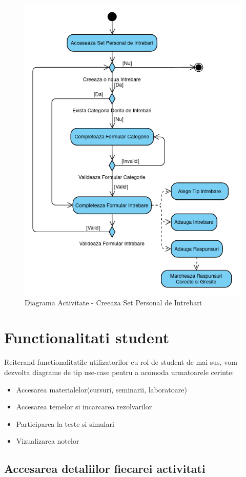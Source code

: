 \documentclass[12pt, a4paper, oneside, romanian]{teza-upb}
\begin{document}
\begin{figure}[H]
\centering
\includegraphics*[width=0.75\columnwidth]{diagrama-activitate-creeaza-set-personal-de-intrebari}
\caption{Diagrama Activitate - Creeaza Set Personal de Intrebari}
\label{diagrama-activitate-creeaza-set-personal-de-intrebari}
\end{figure}

\section{Functionalitati student}

Reiterand functionalitatile utilizatorilor cu rol de student de mai sus, vom dezvolta diagrame de tip use-case pentru a acomoda urmatoarele cerinte:
\begin{itemize}
	\item Accesarea materialelor(cursuri, seminarii, laboratoare)
	\item Accesarea temelor si incarcarea rezolvarilor
	\item Participarea la teste si simulari
	\item Vizualizarea notelor
\end{itemize}

\subsection{Accesarea detaliilor fiecarei activitati}
\end{document}
